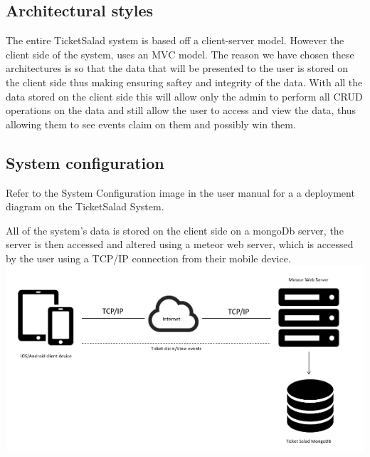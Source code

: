 \documentclass[11pt]{article}
\begin{document}
	\subsection{Architectural styles}
	The entire TicketSalad system is based off a client-server model. However the client side of the system, uses an MVC model. The reason we have chosen these architectures is so that the data that will be presented to the user is stored on the client side thus making ensuring saftey and integrity of the data. With all the data stored on the client side this will allow only the admin to perform all CRUD operations on the data and still allow the user to access and view the data, thus allowing them to see events claim on them and possibly win them.
	\subsection{System configuration}
	Refer to the System Configuration image in the user manual for a a deployment diagram on the TicketSalad System. 
	
	All of the system's data is stored on the client side on a mongoDb server, the server is then accessed and altered using a meteor web server, which is accessed by the user using a TCP/IP connection from their mobile device.
	\newline
	\includegraphics[scale=1]{SystemConfig.png}
	
	
\end{document}
